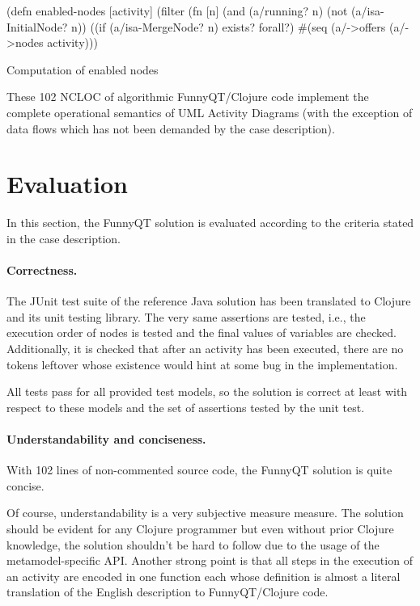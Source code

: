 \documentclass[submission]{eptcs}
\begin{document}
\begin{listing}[h!tb]
\begin{clojurecode}
(defn enabled-nodes [activity]
  (filter (fn [n]
            (and (a/running? n)
                 (not (a/isa-InitialNode? n))
                 ((if (a/isa-MergeNode? n) exists? forall?)
                  #(seq (a/->offers %
          (a/->nodes activity)))
\end{clojurecode}
\caption{Computation of enabled nodes}
\label{lst:enabled-nodes}
\end{listing}

These 102 NCLOC of algorithmic FunnyQT/Clojure code implement the complete
operational semantics of UML Activity Diagrams (with the exception of data
flows which has not been demanded by the case description).

\section{Evaluation}
\label{sec:evaluation}

In this section, the FunnyQT solution is evaluated according to the criteria
stated in the case description.

\paragraph{Correctness.}

The JUnit test suite of the reference Java solution has been translated to
Clojure and its unit testing library.  The very same assertions are tested,
i.e., the execution order of nodes is tested and the final values of variables
are checked.  Additionally, it is checked that after an activity has been
executed, there are no tokens leftover whose existence would hint at some bug
in the implementation.

All tests pass for all provided test models, so the solution is correct at
least with respect to these models and the set of assertions tested by the unit
test.


\paragraph{Understandability and conciseness.}

With 102 lines of non-commented source code, the FunnyQT solution is quite
concise.

Of course, understandability is a very subjective measure measure.  The
solution should be evident for any Clojure programmer but even without prior
Clojure knowledge, the solution shouldn't be hard to follow due to the usage of
the metamodel-specific API.  Another strong point is that all steps in the
execution of an activity are encoded in one function each whose definition is
almost a literal translation of the English description to FunnyQT/Clojure
code.
\end{document}
